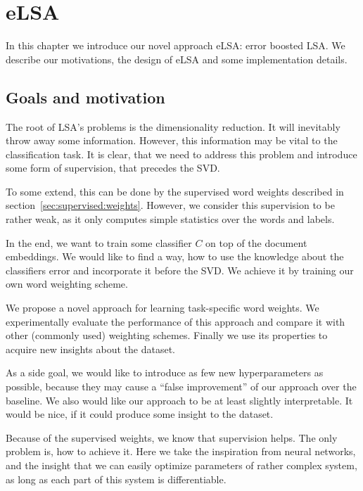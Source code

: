 \chapter{eLSA}

In this chapter we introduce our novel approach eLSA: error boosted LSA.
We describe our motivations, the design of eLSA and some implementation details.

\section{Goals and motivation}

    The root of LSA's problems is the dimensionality reduction.
    It will inevitably throw away some information. 
    However, this information may be vital to the classification task. 
    It is clear, that we need to address this problem and introduce some form of supervision, that precedes the SVD.
    
    To some extend, this can be done by the supervised word weights described in section~\ref{sec:supervised:weights}.
    However, we consider this supervision to be rather weak, as it only computes simple statistics over the words and labels.
    
    In the end, we want to train some classifier $C$ on top of the document embeddings.
    We would like to find a way, how to use the knowledge about the classifiers error and incorporate it before the SVD.
    We achieve it by training our own word weighting scheme. 
    
    We propose a novel approach for learning task-specific word weights.
    We experimentally evaluate the performance of this approach and compare it with other (commonly used) weighting schemes. 
    Finally we use its properties to acquire new insights about the dataset.

    As a side goal, we would like to introduce as few new hyperparameters as possible,
    because they may cause a ``false improvement'' of our approach over the baseline.
    We also would like our approach to be at least slightly interpretable.
    It would be nice, if it could produce some insight to the dataset.
    
    Because of the supervised weights, we know that supervision helps. 
    The only problem is, how to achieve it. 
    Here we take the inspiration from neural networks, and the insight that we can easily optimize parameters of rather complex system, as long as each part of this system is differentiable. 

